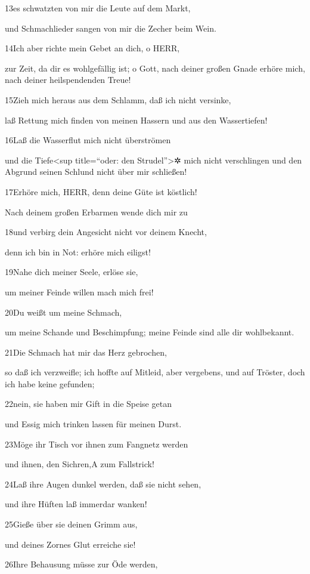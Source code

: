 13es schwatzten von mir die Leute auf dem Markt,

und Schmachlieder sangen von mir die Zecher beim Wein.

14Ich aber richte mein Gebet an dich, o HERR,

zur Zeit, da dir es wohlgefällig ist; o Gott, nach deiner großen Gnade
erhöre mich, nach deiner heilspendenden Treue!

15Zieh mich heraus aus dem Schlamm, daß ich nicht versinke,

laß Rettung mich finden von meinen Hassern und aus den Wassertiefen!

16Laß die Wasserflut mich nicht überströmen

und die Tiefe\textless sup title=``oder: den Strudel''\textgreater✲ mich
nicht verschlingen und den Abgrund seinen Schlund nicht über mir
schließen!

17Erhöre mich, HERR, denn deine Güte ist köstlich!

Nach deinem großen Erbarmen wende dich mir zu

18und verbirg dein Angesicht nicht vor deinem Knecht,

denn ich bin in Not: erhöre mich eiligst!

19Nahe dich meiner Seele, erlöse sie,

um meiner Feinde willen mach mich frei!

20Du weißt um meine Schmach,

um meine Schande und Beschimpfung; meine Feinde sind alle dir
wohlbekannt.

21Die Schmach hat mir das Herz gebrochen,

so daß ich verzweifle; ich hoffte auf Mitleid, aber vergebens, und auf
Tröster, doch ich habe keine gefunden;

22nein, sie haben mir Gift in die Speise getan

und Essig mich trinken lassen für meinen Durst.

23Möge ihr Tisch vor ihnen zum Fangnetz werden

und ihnen, den Sichren,{A} zum Fallstrick!

24Laß ihre Augen dunkel werden, daß sie nicht sehen,

und ihre Hüften laß immerdar wanken!

25Gieße über sie deinen Grimm aus,

und deines Zornes Glut erreiche sie!

26Ihre Behausung müsse zur Öde werden,

